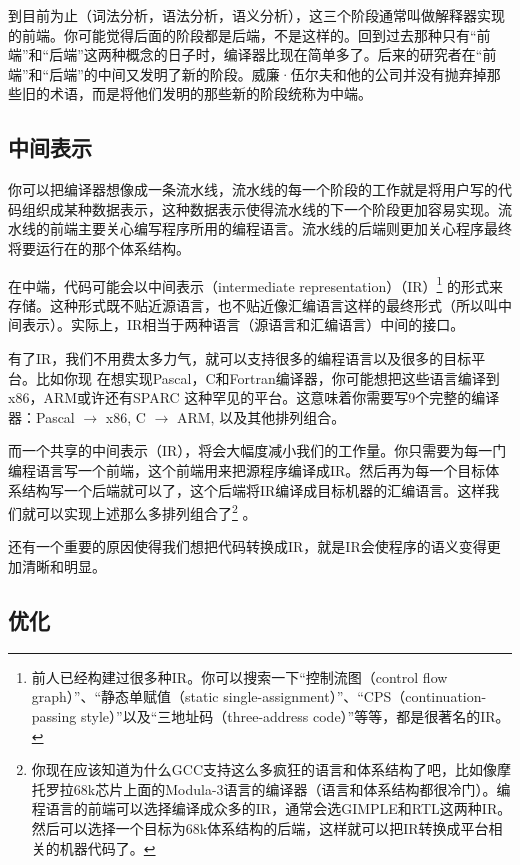 \documentclass[cn,10pt,math=newtx,citestyle=gb7714-2015,bibstyle=gb7714-2015]{elegantbook}
\begin{document}
到目前为止（词法分析，语法分析，语义分析），这三个阶段通常叫做解释器实现的前端。你可能觉得后面的阶段都是后端，不是这样的。回到过去那种只有“前端”和“后端”这两种概念的日子时，编译器比现在简单多了。后来的研究者在“前端”和“后端”的中间又发明了新的阶段。威廉·伍尔夫和他的公司并没有抛弃掉那些旧的术语，而是将他们发明的那些新的阶段统称为中端。

\subsection{中间表示}

你可以把编译器想像成一条流水线，流水线的每一个阶段的工作就是将用户写的代码组织成某种数据表示，这种数据表示使得流水线的下一个阶段更加容易实现。流水线的前端主要关心编写程序所用的编程语言。流水线的后端则更加关心程序最终将要运行在的那个体系结构。

在中端，代码可能会以中间表示（intermediate representation）（IR）\footnote{前人已经构建过很多种IR。你可以搜索一下“控制流图（control flow graph）”、“静态单赋值（static single-assignment）”、“CPS（continuation-passing style）”以及“三地址码（three-address code）”等等，都是很著名的IR。} 的形式来存储。这种形式既不贴近源语言，也不贴近像汇编语言这样的最终形式（所以叫中间表示）。实际上，IR相当于两种语言（源语言和汇编语言）中间的接口。

有了IR，我们不用费太多力气，就可以支持很多的编程语言以及很多的目标平台。比如你现
在想实现Pascal，C和Fortran编译器，你可能想把这些语言编译到x86，ARM或许还有SPARC
这种罕见的平台。这意味着你需要写9个完整的编译器：Pascal $\rightarrow$ x86, C $\rightarrow$ ARM, 以及其他排列组合。

而一个共享的中间表示（IR），将会大幅度减小我们的工作量。你只需要为每一门编程语言写一个前端，这个前端用来把源程序编译成IR。然后再为每一个目标体系结构写一个后端就可以了，这个后端将IR编译成目标机器的汇编语言。这样我们就可以实现上述那么多排列组合了\footnote{你现在应该知道为什么GCC支持这么多疯狂的语言和体系结构了吧，比如像摩托罗拉68k芯片上面的Modula-3语言的编译器（语言和体系结构都很冷门）。编程语言的前端可以选择编译成众多的IR，通常会选GIMPLE和RTL这两种IR。然后可以选择一个目标为68k体系结构的后端，这样就可以把IR转换成平台相关的机器代码了。} 。

还有一个重要的原因使得我们想把代码转换成IR，就是IR会使程序的语义变得更加清晰和明显。

\subsection{优化}
\end{document}
